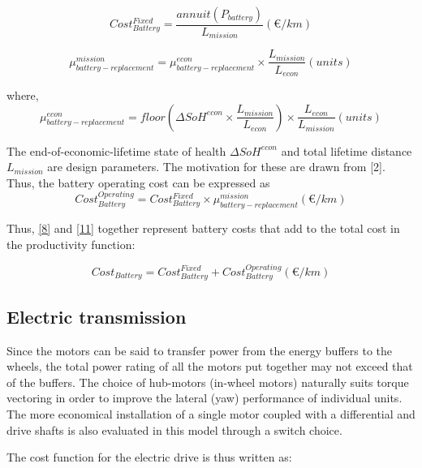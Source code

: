 \documentclass[ExampleMasters.tex]{subfiles}
\begin{document}
			\begin{equation} \label{8}
				Cost_{Battery}^{Fixed} = \frac{annuit(P_{battery})}{L_{mission}} (\euro{}/km)
			\end{equation}

			\begin{equation}
				\mu_{battery-replacement}^{mission} = \mu_{battery-replacement}^{econ} \times \frac{L_ {mission}}{L_{econ}} (units)
			\end{equation}

			where,
			\begin{equation}
				\mu_{battery-replacement}^{econ} = floor(\Delta SoH^{econ}\times \frac{L_ {mission}}{L_{econ}}) \times \frac{L_ {econ}}{L_{mission}} (units)
			\end{equation}

			The end-of-economic-lifetime state of health $\Delta SoH^{econ}$ and total lifetime distance $L_{mission}$ are design parameters. The motivation for these are drawn from [2]. Thus, the battery operating cost can be expressed as
			\begin{equation} \label{11}
				Cost_{Battery}^{Operating} = Cost_{Battery}^{Fixed} \times \mu_{battery-replacement}^{mission} (\euro{}/km)
			\end{equation}

			Thus, \eqref{8} and \eqref{11} together represent battery costs that add to the total cost in the productivity function:

			\begin{equation}
				Cost_{Battery} = Cost_{Battery}^{Fixed} + Cost_{Battery}^{Operating} (\euro{}/km)
			\end{equation}

		\subsection{Electric transmission}

			Since the motors can be said to transfer power from the energy buffers to the wheels, the total power rating of all the motors put together may not exceed that of the buffers. The choice of hub-motors (in-wheel motors) naturally suits torque vectoring in order to improve the lateral (yaw) performance of individual units. The more economical installation of a single motor coupled with a differential and drive shafts is also evaluated in this model through a switch choice. 

			The cost function for the electric drive is thus written as:
\end{document}
